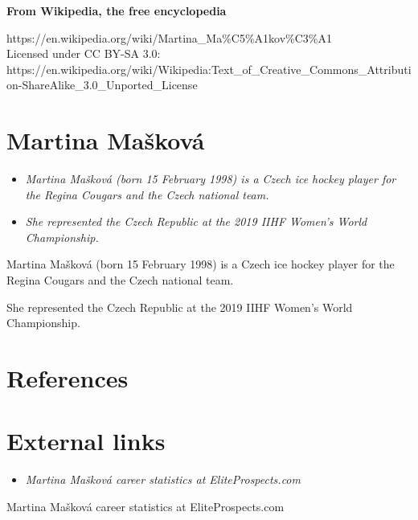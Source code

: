 \textbf{From Wikipedia, the free encyclopedia}

https://en.wikipedia.org/wiki/Martina\_Ma\%C5\%A1kov\%C3\%A1\\
Licensed under CC BY-SA 3.0:\\
https://en.wikipedia.org/wiki/Wikipedia:Text\_of\_Creative\_Commons\_Attribution-ShareAlike\_3.0\_Unported\_License

\section{Martina Mašková}\label{martina-maux161kovuxe1}

\begin{itemize}
\item
  \emph{Martina Mašková (born 15 February 1998) is a Czech ice hockey
  player for the Regina Cougars and the Czech national team.}
\item
  \emph{She represented the Czech Republic at the 2019 IIHF Women's
  World Championship.}
\end{itemize}

Martina Mašková (born 15 February 1998) is a Czech ice hockey player for
the Regina Cougars and the Czech national team.

She represented the Czech Republic at the 2019 IIHF Women's World
Championship.

\section{References}\label{references}

\section{External links}\label{external-links}

\begin{itemize}
\item
  \emph{Martina Mašková career statistics at EliteProspects.com}
\end{itemize}

Martina Mašková career statistics at EliteProspects.com
